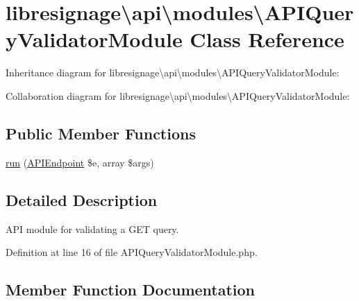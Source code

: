\hypertarget{classlibresignage_1_1api_1_1modules_1_1APIQueryValidatorModule}{}\section{libresignage\textbackslash{}api\textbackslash{}modules\textbackslash{}A\+P\+I\+Query\+Validator\+Module Class Reference}
\label{classlibresignage_1_1api_1_1modules_1_1APIQueryValidatorModule}


Inheritance diagram for libresignage\textbackslash{}api\textbackslash{}modules\textbackslash{}A\+P\+I\+Query\+Validator\+Module\+:


Collaboration diagram for libresignage\textbackslash{}api\textbackslash{}modules\textbackslash{}A\+P\+I\+Query\+Validator\+Module\+:
\subsection*{Public Member Functions}
\begin{DoxyCompactItemize}
\item 
\hyperlink{classlibresignage_1_1api_1_1modules_1_1APIQueryValidatorModule_a338a7bb3b4a99b289cb051ba5f2714ac}{run} (\hyperlink{classlibresignage_1_1api_1_1APIEndpoint}{A\+P\+I\+Endpoint} \$e, array \$args)
\end{DoxyCompactItemize}


\subsection{Detailed Description}
A\+PI module for validating a G\+ET query. 

Definition at line 16 of file A\+P\+I\+Query\+Validator\+Module.\+php.



\subsection{Member Function Documentation}
\mbox{\label{classlibresignage_1_1api_1_1modules_1_1APIQueryValidatorModule_a338a7bb3b4a99b289cb051ba5f2714ac}} 
